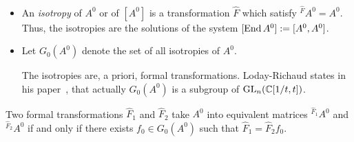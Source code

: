 \begin{defn}
  \begin{itemize}
    \item An \emph{isotropy} of $A^0$ or of $[A^0]$ is a transformation
      $\hat F$ which satisfy ${}^{\hat F}\!A^0=A^0$.
      Thus, the isotropies are the solutions of the system
      $[\operatorname{End} A^0]:=[A^0,A^0]$.
    \item Let $G_0(A^0)$ denote the set of all isotropies of $A^0$.
      \begin{s-rem}
        The isotropies are, a priori, formal transformations.
        Loday-Richaud states in his paper~\cite[853]{Loday1994}, that actually
        $G_0(A^0)$ is a subgroup of $\operatorname{GL}_n(\mathbb{C}[1/t,t])$.
      \end{s-rem}
  \end{itemize}
\end{defn}
\begin{lem}
  Two formal transformations $\hat F_1$ and $\hat F_2$ take $A^0$ into
  equivalent matrices ${}^{\hat F_1}\!A^0$ and  ${}^{\hat F_2}\!A^0$ if and
  only if there exists $f_0\in G_0(A^0)$ such that $\hat F_1=\hat F_2f_0$.
\end{lem}
\begin{comment}
  \begin{proof}
    \TODO[Look at \cite{BJL1979Birkhoff}?]
  \end{proof}
\end{comment}

